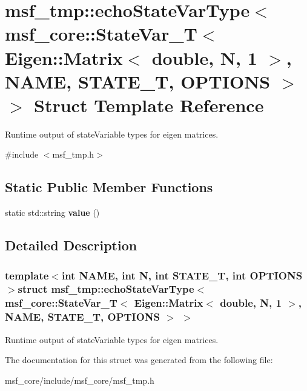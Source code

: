 \hypertarget{structmsf__tmp_1_1echoStateVarType_3_01msf__core_1_1StateVar__T_3_01Eigen_1_1Matrix_3_01double_0de9def0e1695f00da0e5db77a247f121}{\section{msf\-\_\-tmp\-:\-:echo\-State\-Var\-Type$<$ msf\-\_\-core\-:\-:State\-Var\-\_\-\-T$<$ Eigen\-:\-:Matrix$<$ double, N, 1 $>$, N\-A\-M\-E, S\-T\-A\-T\-E\-\_\-\-T, O\-P\-T\-I\-O\-N\-S $>$ $>$ Struct Template Reference}
\label{structmsf__tmp_1_1echoStateVarType_3_01msf__core_1_1StateVar__T_3_01Eigen_1_1Matrix_3_01double_0de9def0e1695f00da0e5db77a247f121}
}


Runtime output of state\-Variable types for eigen matrices.  




{\ttfamily \#include $<$msf\-\_\-tmp.\-h$>$}

\subsection*{Static Public Member Functions}
\begin{DoxyCompactItemize}
\item 
\hypertarget{structmsf__tmp_1_1echoStateVarType_3_01msf__core_1_1StateVar__T_3_01Eigen_1_1Matrix_3_01double_0de9def0e1695f00da0e5db77a247f121_a5783e4c26703f36848eb542f764be7d1}{static std\-::string {\bfseries value} ()}\label{structmsf__tmp_1_1echoStateVarType_3_01msf__core_1_1StateVar__T_3_01Eigen_1_1Matrix_3_01double_0de9def0e1695f00da0e5db77a247f121_a5783e4c26703f36848eb542f764be7d1}

\end{DoxyCompactItemize}


\subsection{Detailed Description}
\subsubsection*{template$<$int N\-A\-M\-E, int N, int S\-T\-A\-T\-E\-\_\-\-T, int O\-P\-T\-I\-O\-N\-S$>$struct msf\-\_\-tmp\-::echo\-State\-Var\-Type$<$ msf\-\_\-core\-::\-State\-Var\-\_\-\-T$<$ Eigen\-::\-Matrix$<$ double, N, 1 $>$, N\-A\-M\-E, S\-T\-A\-T\-E\-\_\-\-T, O\-P\-T\-I\-O\-N\-S $>$ $>$}

Runtime output of state\-Variable types for eigen matrices. 

The documentation for this struct was generated from the following file\-:\begin{DoxyCompactItemize}
\item 
msf\-\_\-core/include/msf\-\_\-core/msf\-\_\-tmp.\-h\end{DoxyCompactItemize}
